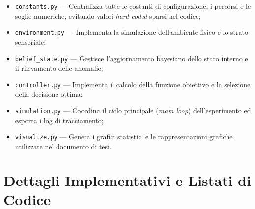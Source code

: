 \begin{itemize}
    \item \texttt{constants.py} --- Centralizza tutte le costanti di configurazione, i percorsi e le soglie numeriche, evitando valori \emph{hard-coded} sparsi nel codice;
    \item \texttt{environment.py} --- Implementa la simulazione dell'ambiente fisico e lo strato sensoriale;
    \item \texttt{belief\_state.py} --- Gestisce l'aggiornamento bayesiano dello stato interno e il rilevamento delle anomalie;
    \item \texttt{controller.py} --- Implementa il calcolo della funzione obiettivo e la selezione della decisione ottima;
    \item \texttt{simulation.py} --- Coordina il ciclo principale (\emph{main loop}) dell'esperimento ed esporta i log di tracciamento;
    \item \texttt{visualize.py} --- Genera i grafici statistici e le rappresentazioni grafiche utilizzate nel documento di tesi.
\end{itemize}


\section{Dettagli Implementativi e Listati di Codice}
\label{sec:dettagli-codice}

